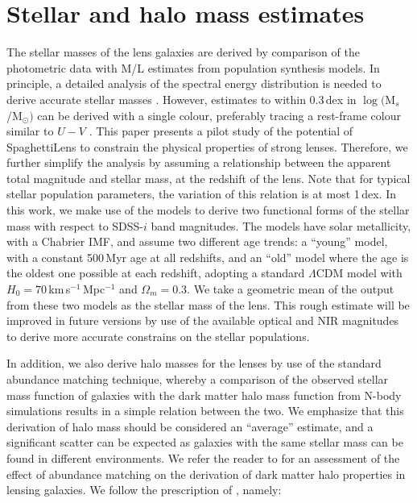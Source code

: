 \section{Stellar and halo mass estimates}\label{sec:stellar-mass}

The stellar masses of the lens galaxies are derived by comparison of
the photometric data with M/L estimates from population synthesis
models.  In principle, a detailed analysis of the spectral energy
distribution is needed to derive accurate stellar masses
\citep[e.g.][]{2009ApJS..185..253G,2011MNRAS.418.1587T}.
However, estimates to within 0.3\,dex in $\log($M$_s$/M$_\odot)$ can be
derived with a single colour, preferably tracing a rest-frame colour
similar to $U-V$ \citep[see fig.~1 of][]{2008MNRAS.383..857F}. This
paper presents a pilot study of the potential of SpaghettiLens to
constrain the physical properties of strong lenses. Therefore, we
further simplify the analysis by assuming a relationship between the
apparent total magnitude and stellar mass, at the redshift of the
lens. Note that for typical stellar population parameters, the
variation of this relation is at most 1\,dex. In this work, we make
use of the \citet{2003MNRAS.344.1000B} models to derive two functional
forms of the stellar mass with respect to SDSS-$i$ band
magnitudes. The models have solar metallicity, with a Chabrier
IMF, and assume two different age trends: a ``young'' model, with a
constant 500\,Myr age at all redshifts, and an ``old'' model where the
age is the oldest one possible at each redshift, adopting a
standard $\Lambda$CDM model with $H_0=70$\,km\,s$^{-1}$\,Mpc$^{-1}$
and $\Omega_m=0.3$. We take a geometric mean of the output from these
two models as the stellar mass of the lens. This rough estimate will
be improved in future versions by use of the available optical and NIR
magnitudes to derive more accurate constrains on the stellar
populations.

In addition, we also derive halo masses for the lenses by use of the
standard abundance matching technique, whereby a comparison of the
observed stellar mass function of galaxies with the dark matter halo
mass function from N-body simulations results in a simple relation
between the two. We emphasize that this derivation of halo mass should
be considered an ``average'' estimate, and a significant scatter can
be expected as galaxies with the same stellar mass can be found in
different environments. We refer the reader to \cite{2012MNRAS.424..104L}
for an assessment of the effect of abundance matching on the
derivation of dark matter halo properties in lensing galaxies. We
follow the prescription of \citet{2010ApJ...710..903M}, namely:

